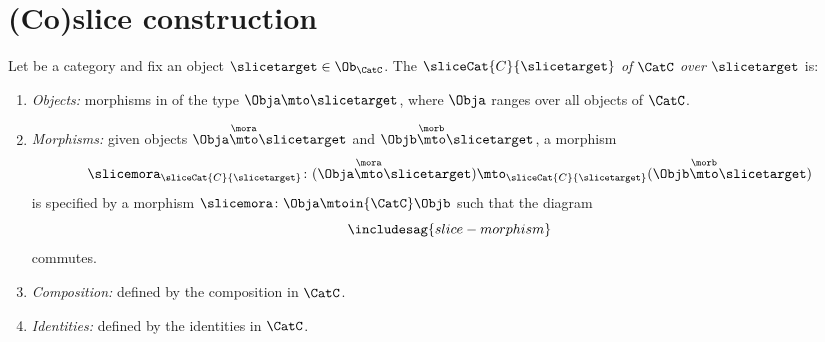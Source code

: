 
\section{(Co)slice construction}


\begin{ctdefinition}
    \label{def:slice-category}

    Let \CatC be a category and fix an object $\slicetarget \in \Ob_\CatC$.
    The  $\sliceCat{C}{\slicetarget}$ \emph{of} $\CatC$ \emph{over} $\slicetarget$ is:
    \begin{enumerate}
        \item \emph{Objects:} morphisms in \CatC of the type $\Obja \mto \slicetarget$, where $\Obja$ ranges over all objects of $\CatC$.
        \item \emph{Morphisms:} given objects $\Obja \overset{\mora}{\mto} \slicetarget$ and $\Objb \overset{\morb}{\mto} \slicetarget$, a morphism
              \begin{equation}
                  \slicemora_{\sliceCat{C}{\slicetarget}} \colon (\Obja \overset{\mora}{\mto} \slicetarget) \mto_{\sliceCat{C}{\slicetarget}} (\Objb \overset{\morb}{\mto} \slicetarget)
              \end{equation}
              is specified by a morphism $\slicemora \colon \Obja \mtoin{\CatC} \Objb$ such that the diagram
              \begin{equation}\label{eq:slice-morphism}
                  \includesag{slice-morphism}
              \end{equation}
              commutes.

        \item \emph{Composition:} defined by the composition in $\CatC$.
        \item \emph{Identities:} defined by the identities in $\CatC$.
    \end{enumerate}
\end{ctdefinition}

